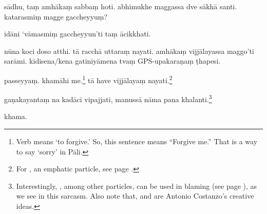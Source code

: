 \begin{answerkey}
\item s\=adhu, ta\d m amh\=aka\d m sabba\d m hoti. abhimukhe maggassa dve s\=akh\=a santi. katarasmi\d m magge gaccheyyu\d m?
\item id\=ani `v\=amasmi\d m gaccheyyun'ti ta\d m \=acikkhati.
\item n\=una koci doso atthi. t\=a racch\=a uttara\d m nayati. amh\=aka\d m vijj\=alayassa maggo'ti sar\=ami. k\=idisena/kena gatiniy\=amena tva\d m GPS-upakara\d na\d m \d thapesi.
\item passeyya\d m. kham\=ahi me.\footnote{Verb  means `to forgive.' So, this sentence means ``Forgive me.'' That is a way to say `sorry' in P\=ali.} t\=a have vijj\=alaya\d m nayati.\footnote{For , an emphatic particle, see page \pageref{nip:have}.}
\item ga\d nakayanta\d m na kad\=aci vipajjati, manuss\=a n\=ama pana khalanti.\footnote{Interestingly, , among other particles, can be used in blaming (see page \pageref{nip:naama}), as we see in this sarcasm. Also note that,  and  are Antonio Costanzo's creative ideas.}
\item khama.
\end{answerkey}


